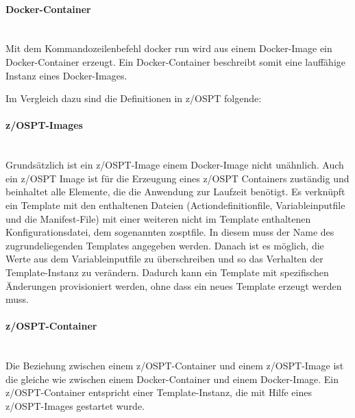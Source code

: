 \paragraph{\glqq Docker-Container\grqq}~\\
Mit dem Kommandozeilenbefehl \glqq docker run\grqq{} wird aus einem Docker-Image ein Docker-Container erzeugt.
Ein Docker-Container beschreibt somit eine lauffähige Instanz eines Docker-Images.
\cite[Kap. 1]{Vohra.2016}

Im Vergleich dazu sind die Definitionen in z/OSPT folgende:

\paragraph{\glqq z/OSPT-Images\grqq}~\\
Grundsätzlich ist ein z/OSPT-Image einem Docker-Image nicht unähnlich.
Auch ein z/OSPT Image ist für die Erzeugung eines z/OSPT Containers zuständig und beinhaltet alle Elemente, die die Anwendung zur Laufzeit benötigt.
Es verknüpft ein Template mit den enthaltenen Dateien (Actiondefinitionfile, Variableinputfile und die Manifest-File) mit einer weiteren nicht im Template enthaltenen Konfigurationsdatei, dem sogenannten \glqq zosptfile\grqq.
In diesem muss der Name des zugrundeliegenden Templates angegeben werden.
Danach ist es möglich, die Werte aus dem Variableinputfile zu überschreiben und so das Verhalten der Template-Instanz zu verändern.
Dadurch kann ein Template mit spezifischen Änderungen provisioniert werden, ohne dass ein neues Template erzeugt werden muss.

\paragraph{\glqq z/OSPT-Container\grqq}~\\
Die Beziehung zwischen einem z/OSPT-Container und einem z/OSPT-Image ist die gleiche wie zwischen einem Docker-Container und einem Docker-Image.
Ein z/OSPT-Container entspricht einer Template-Instanz, die mit Hilfe eines z/OSPT-Images gestartet wurde.

